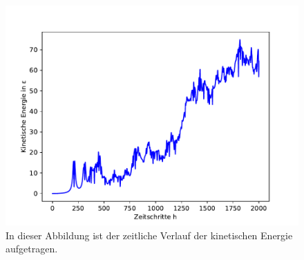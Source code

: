 \begin{figure}[H]
    \centering
    \includegraphics[scale=0.5]{MolDyn/Small Boy/kinetic_energy.pdf}
    \caption{In dieser Abbildung ist der zeitliche Verlauf der kinetischen Energie aufgetragen.}
    \label{fig:kin}
\end{figure}
\newpage
